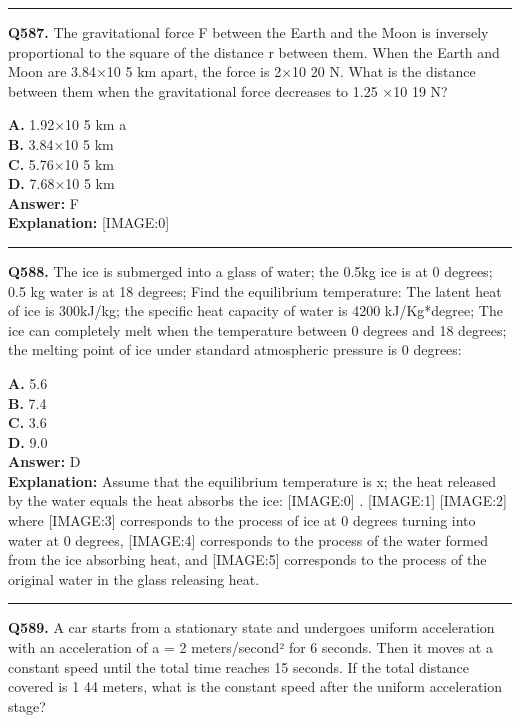 \documentclass[12pt]{article}
\begin{document}
\hrule
\vspace{1em}


\noindent
\textbf{Q587.} The gravitational force F between the Earth and the Moon is inversely proportional to the square of the distance r between them. When the Earth and Moon are 3.84×10
5
km apart, the force is 2×10
20
N. What is the distance between them when the gravitational force decreases to
1.25
×10
19
N?



\textbf{A.} 1.92×10
5
km
a \\
\textbf{B.} 3.84×10
5
km \\
\textbf{C.} 5.76×10
5
km \\
\textbf{D.} 7.68×10
5
km \\

\textbf{Answer:} F \\
\textbf{Explanation:} [IMAGE:0]

\hrule
\vspace{1em}


\noindent
\textbf{Q588.} The ice is submerged into a glass of water; the 0.5kg ice is at 0 degrees; 0.5 kg water is at 18 degrees; Find the equilibrium temperature: The latent heat of ice is 300kJ/kg; the specific heat capacity of water is 4200 kJ/Kg*degree; The ice can completely melt when the temperature between 0 degrees and 18 degrees; the melting point of ice under standard atmospheric pressure is 0 degrees:



\textbf{A.} 5.6 \\
\textbf{B.} 7.4 \\
\textbf{C.} 3.6 \\
\textbf{D.} 9.0 \\

\textbf{Answer:} D \\
\textbf{Explanation:} Assume that the equilibrium temperature is x; the heat released by the water equals the heat absorbs the ice:
[IMAGE:0]
.
[IMAGE:1]
[IMAGE:2]
where
[IMAGE:3]
corresponds to the process of ice at 0 degrees turning into water at 0 degrees,
[IMAGE:4]
corresponds to the process of the water formed from the ice absorbing heat, and
[IMAGE:5]
corresponds to the process of the original water in the glass releasing heat.

\hrule
\vspace{1em}


\noindent
\textbf{Q589.} A car starts from a stationary state and undergoes uniform acceleration with an acceleration of a = 2 meters/second² for 6 seconds. Then it moves at a constant speed until the total time reaches 15 seconds. If the total distance covered is 1
44
meters, what is the constant speed after the uniform acceleration stage?
\end{document}
